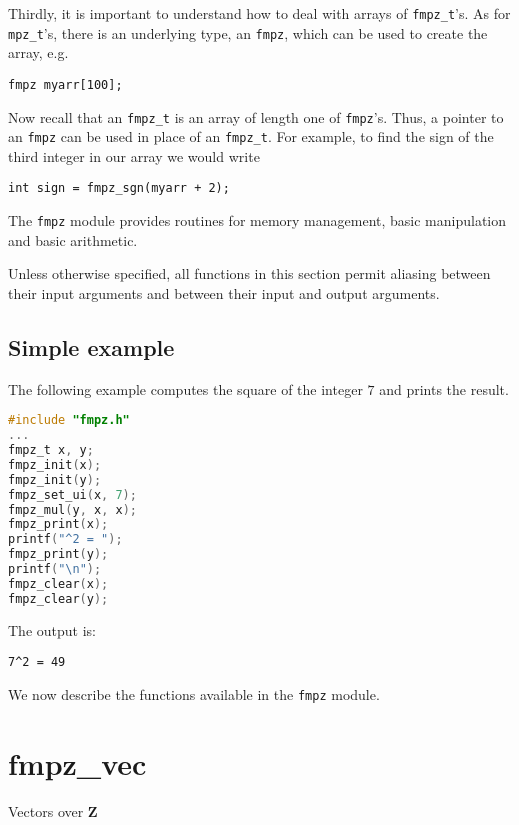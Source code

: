 \documentclass[a4paper,10pt]{book}
\newcommand{\Z}{\mathbf{Z}}%
\newcommand{\code}{\lstinline}
\begin{document}
Thirdly, it is important to understand how to deal with arrays of 
\code{fmpz_t}'s.  As for \code{mpz_t}'s, there is an underlying type, 
an \code{fmpz}, which can be used to create the array, e.g.\ 
\begin{lstlisting}
fmpz myarr[100];
\end{lstlisting}
Now recall that an \code{fmpz_t} is an array of length one of \code{fmpz}'s.
Thus, a pointer to an \code{fmpz} can be used in place of an \code{fmpz_t}.
For example, to find the sign of the third integer in our array we would 
write 
\begin{lstlisting}
int sign = fmpz_sgn(myarr + 2);
\end{lstlisting}

The \code{fmpz} module provides routines for memory management, basic 
manipulation and basic arithmetic.

Unless otherwise specified, all functions in this section permit aliasing 
between their input arguments and between their input and output 
arguments.

\section{Simple example}

The following example computes the square of the integer $7$ and prints 
the result.
\begin{lstlisting}[language=c]
#include "fmpz.h"
...
fmpz_t x, y;
fmpz_init(x);
fmpz_init(y);
fmpz_set_ui(x, 7);
fmpz_mul(y, x, x);
fmpz_print(x);
printf("^2 = ");
fmpz_print(y);
printf("\n");
fmpz_clear(x);
fmpz_clear(y);
\end{lstlisting}

The output is:
\begin{lstlisting}
7^2 = 49
\end{lstlisting}

We now describe the functions available in the \code{fmpz} module.




\chapter{fmpz\_vec}
\epigraph{Vectors over $\Z$}{}
\end{document}
